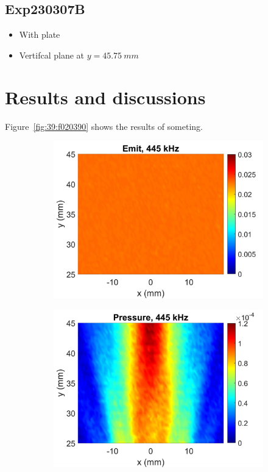 \documentclass{article}
\begin{document}
\subsection{Exp230307B}
\label{sec:Exp230307B}
\begin{itemize}
    \item With plate
    \item Vertifcal plane at $y=\SI{45.75}{mm}$
\end{itemize}


\section{Results and discussions}
Figure~\ref{fig:39:f020390} shows the results of someting.
\begin{figure}[!htb]
    \centering
    \begin{subfigure}{0.32\textwidth}
        \centering
        \includegraphics[width = \textwidth]{../../matlab/exp/fig/AnalyzeData_230227D_Exp230223B_EmitPrs}
        \caption{}
    \end{subfigure}
    \begin{subfigure}{0.32\textwidth}
        \centering
        \includegraphics[width = \textwidth]{../../matlab/exp/fig/AnalyzeData_230227D_Exp230223B_RecPrs.jpg}

\end{subfigure}
\end{figure}
\end{document}
